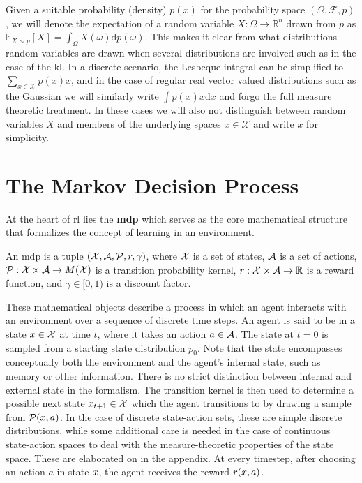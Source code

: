 Given a suitable probability (density) $p(x)$ for the probability space $(\Omega,\mathcal{F},p)$, we will denote the expectation of a random variable $X: \Omega \rightarrow \mathbb{R}^n$ drawn from $p$ as $\mathbb{E}_{X \sim p}\left[X\right] = \int_{\Omega} X(\omega) \mathrm{d} p(\omega)$.
This makes it clear from what distributions random variables are drawn when several distributions are involved such as in the case of the \ac{kl}.
In a discrete scenario, the Lesbeque integral can be simplified to $\sum_{x \in \mathcal{X}} p(x) x$, and in the case of regular real vector valued distributions such as the Gaussian we will similarly write $\int p(x) x \mathrm{d} x$ and forgo the full measure theoretic treatment.
In these cases we will also not distinguish between random variables $X$ and members of the underlying spaces $x \in \mathcal{X}$ and write $x$ for simplicity.


\section{The Markov Decision Process}
\label{chap:background:mdp}


At the heart of \ac{rl} lies the \textbf{\ac{mdp}} which serves as the core mathematical structure that formalizes the concept of learning in an environment.


\begin{definition}
An {\ac{mdp}} is a tuple $(\mathcal{X},\mathcal{A},\mathcal{P},r,\gamma)$, where $\mathcal{X}$ is a set of states, $\mathcal{A}$ is a set of actions, $\mathcal{P}: \mathcal{X} \times \mathcal{A} \rightarrow M(\mathcal{X})$ is a transition probability kernel, $r: \mathcal{X} \times \mathcal{A} \rightarrow \mathbb{R}$ is a reward function, and $\gamma \in [0,1)$ is a discount factor.
\end{definition}

These mathematical objects describe a process in which an agent interacts with an environment over a sequence of discrete time steps.
An agent is said to be in a state $x \in \mathcal{X}$ at time $t$, where it takes an action $a \in \mathcal{A}$.
The state at $t=0$ is sampled from a starting state distribution $p_0$.
Note that the state encompasses conceptually both the environment and the agent's internal state, such as memory or other information.
There is no strict distinction between internal and external state in the formalism.
The transition kernel is then used to determine a possible next state $x_{t+1} \in \mathcal{X}$ which the agent transitions to by drawing a sample from $\mathcal{P}(x,a)$.
In the case of discrete state-action sets, these are simple discrete distributions, while some additional care is needed in the case of continuous state-action spaces to deal with the measure-theoretic properties of the state space.
These are elaborated on in the appendix.
At every timestep, after choosing an action $a$ in state $x$, the agent receives the reward $r(x,a)$.

